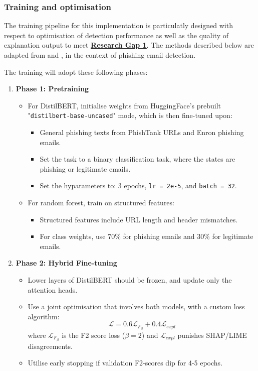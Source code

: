 
\subsubsection*{Training and optimisation}
The training pipeline for this implementation is particulatly designed with respect to optimisation of detection performance as well as the quality of explanation output to meet \hyperref[research-gap-1]{\uline{\textbf{Research Gap 1}}}. The methods described below are adapted from \cite{do2024integrated} and \cite{shendkar2024enhancing}, in the context of phishing email detection.\newline

\noindent The training will adopt these following phases:

\begin{enumerate}
  \item \textbf{Phase 1: Pretraining}
  \begin{itemize}
    \item For DistilBERT, initialise weights from HuggingFace's prebuilt "\texttt{distilbert-base-uncased}" mode, which is then fine-tuned upon:
    \begin{itemize}
      \item General phishing texts from PhishTank URLs and Enron phishing emails.
      \item Set the task to a binary classification task, where the states are phishing or legitimate emails.
      \item Set the hyparameters to: 3 epochs, \texttt{lr = 2e-5}, and \texttt{batch = 32}.
    \end{itemize}
    \item For random forest, train on structured features:
    \begin{itemize}
      \item Structured features include URL length and header mismatches.
      \item For class weights, use 70\% for phishing emails and 30\% for legitimate emails.
    \end{itemize}
  \end{itemize}
  \item \textbf{Phase 2: Hybrid Fine-tuning}
  \begin{itemize}
    \item Lower layers of DistilBERT should be frozen, and update only the attention heads.
    \item Use a joint optimisation that involves both models, with a custom loss algorithm:
    \begin{equation}
      \mathcal{L} = 0.6\mathcal{L}_{F_\beta} + 0.4\mathcal{L}_{expl}
    \end{equation}
    where $\mathcal{L}_{F_\beta}$ is the F2 score loss ($\beta=2$) and $\mathcal{L}_{expl}$ punishes SHAP/LIME disagreements.
    \item Utilise early stopping if validation F2-scores dip for 4-5 epochs.
  \end{itemize}
\end{enumerate}

